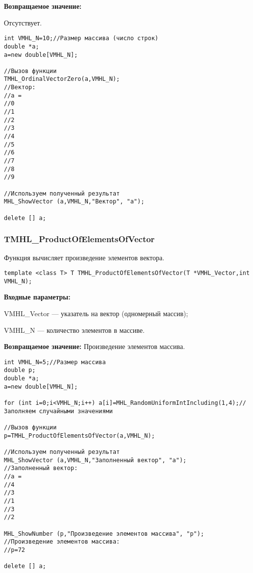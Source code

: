 \documentclass[a4paper,12pt]{article}
\begin{document}
\textbf{Возвращаемое значение:}

Отсутствует.


\begin{lstlisting}[label=code_use_TMHL_OrdinalVectorZero,caption=Пример использования]
int VMHL_N=10;//Размер массива (число строк)
double *a;
a=new double[VMHL_N];

//Вызов функции
TMHL_OrdinalVectorZero(a,VMHL_N);
//Вектор:
//a =
//0
//1
//2
//3
//4
//5
//6
//7
//8
//9

//Используем полученный результат
MHL_ShowVector (a,VMHL_N,"Вектор", "a");

delete [] a;
\end{lstlisting}

\subsubsection{TMHL\_ProductOfElementsOfVector}\label{TMHL_ProductOfElementsOfVector}

Функция вычисляет произведение элементов вектора.


\begin{lstlisting}[label=code_syntax_TMHL_ProductOfElementsOfVector,caption=Синтаксис]
template <class T> T TMHL_ProductOfElementsOfVector(T *VMHL_Vector,int VMHL_N);
\end{lstlisting}

\textbf{Входные параметры:}

 VMHL\_Vector --- указатель на вектор (одномерный массив);
 
 VMHL\_N --- количество элементов в массиве.

\textbf{Возвращаемое значение:}
 Произведение элементов массива.


\begin{lstlisting}[label=code_use_TMHL_ProductOfElementsOfVector,caption=Пример использования]
int VMHL_N=5;//Размер массива
double p;
double *a;
a=new double[VMHL_N];

for (int i=0;i<VMHL_N;i++) a[i]=MHL_RandomUniformIntIncluding(1,4);//Заполняем случайными значениями

//Вызов функции
p=TMHL_ProductOfElementsOfVector(a,VMHL_N);

//Используем полученный результат
MHL_ShowVector (a,VMHL_N,"Заполненный вектор", "a");
//Заполненный вектор:
//a =
//4
//3
//1
//3
//2

MHL_ShowNumber (p,"Произведение элементов массива", "p");
//Произведение элементов массива:
//p=72

delete [] a;
\end{lstlisting}
\end{document}
